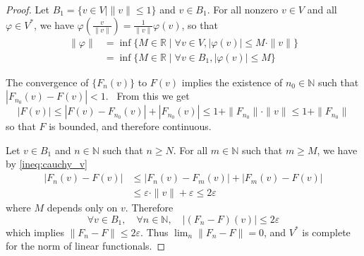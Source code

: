 \documentclass[11pt,a4paper,twoside]{article}
\theoremstyle{definition}
\begin{document}
\begin{proof}
  Let $B_1 = \{ v \in V \mid \| v \| \leq 1 \}$ and $v \in B_1$.
  For all nonzero $v \in V$ and all $\varphi \in V^*$, we have $\varphi ( \frac{v}{\| v \|} ) = \frac{1}{\| v \|} \varphi ( v )$, so that
  \begin{align*}
    \| \varphi \| &= \inf \{ M \in \mathbb{R} \mid \forall v \in V, | \varphi ( v ) | \leq M \cdot \| v \| \} \\
    &= \inf \{ M \in \mathbb{R} \mid \forall v \in B_1, | \varphi ( v ) | \leq M \}
  \end{align*}

  The convergence of $\{ F_n ( v ) \}$ to $F ( v )$ implies the existence of $n_0 \in \mathbb{N}$ such that $| F_{n_0} ( v ) - F ( v ) | < 1$. \
  From this we get
  \begin{equation*}
    | F ( v ) | \leq | F ( v ) - F_{n_0} ( v ) | + | F_{n_0} ( v ) | \leq 1 + \| F_{n_0} \| \cdot \| v \| \leq 1 + \| F_{n_0} \|
  \end{equation*}
  so that $F$ is bounded, and therefore continuous.

  Let $v \in B_1$ and $n \in \mathbb{N}$ such that $n \geq N$. For all $m \in \mathbb{N}$ such that $m \geq M$, we have by \eqref{ineq:cauchy_v}
  \begin{align*}
    | F_n ( v ) - F ( v ) | &\leq | F_n ( v ) - F_m ( v ) | + | F_m ( v ) - F ( v ) | \\
    &\leq \varepsilon \cdot \| v \| + \varepsilon \leq 2 \varepsilon
  \end{align*}
  where $M$ depends only on $v$. Therefore
  \begin{equation*}
    \forall v \in B_1, \quad \forall n \in \mathbb{N}, \quad | ( F_n - F ) ( v ) | \leq 2 \varepsilon
  \end{equation*}
  which implies $\| F_n - F \| \leq 2 \varepsilon$. Thus $\lim_n \| F_n - F \| = 0$, and $V^*$ is complete for the
  norm of linear functionals.

\end{proof}
\end{document}
